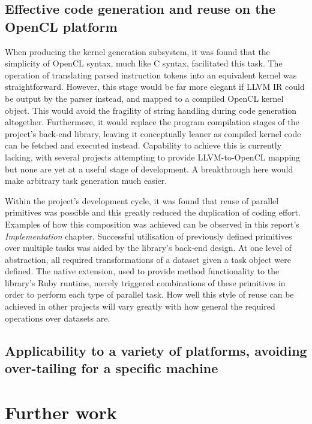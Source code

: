 \subsection{Effective code generation and reuse on the OpenCL platform}
When producing the kernel generation subsystem, it was found that the simplicity of \ac{OpenCL} syntax, much like C syntax, facilitated this task. The operation of translating parsed instruction tokens into an equivalent kernel was straightforward. However, this stage would be far more elegant if LLVM \ac{IR} could be output by the parser instead, and mapped to a compiled \ac{OpenCL} kernel object. This would avoid the fragility of string handling during code generation altogether. Furthermore, it would replace the program compilation stages of the project's back-end library, leaving it conceptually leaner as compiled kernel code can be fetched and executed instead. Capability to achieve this is currently lacking, with several projects attempting to provide LLVM-to-\ac{OpenCL} mapping but none are yet at a useful stage of development. A breakthrough here would make arbitrary task generation much easier.

Within the project's development cycle, it was found that reuse of parallel primitives was possible and this greatly reduced the duplication of coding effort. Examples of how this composition was achieved can be observed in this report's \emph{Implementation} chapter. Successful utilisation of previously defined primitives over multiple tasks was aided by the library's back-end design. At one level of abstraction, all required transformations of a dataset given a task object were defined. The native extension, used to provide method functionality to the library's Ruby runtime, merely triggered combinations of these primitives in order to perform each type of parallel task. How well this style of reuse can be achieved in other projects will vary greatly with how general the required operations over datasets are.


\subsection{Applicability to a variety of platforms, avoiding over-tailing for a specific machine}


\section{Further work}
